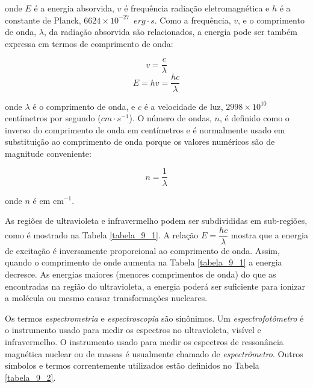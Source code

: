 \noindent onde $E$ é a energia absorvida, $v$ é frequência radiação eletromagnética e $h$ é a constante de Planck, $6624 \times 10^{-27}\enspace erg \cdot s$. Como a frequência, $v$, e o comprimento de onda, $\lambda$, da radiação absorvida são relacionados, a energia pode ser também expressa em termos de comprimento de onda:

\begin{equation}
    v = \dfrac{c}{\lambda}
\end{equation}
\begin{equation}
    E = hv = \dfrac{hc}{\lambda}
\end{equation}

\noindent onde $\lambda$ é o comprimento de onda, e $c$ é a velocidade de luz, $2998 \times 10^{10}$ centímetros por segundo ($cm \cdot s^{-1}$). O número de ondas, $n$, é definido como o inverso do comprimento de onda em centímetros e é normalmente usado em substituição ao comprimento de onda porque os valores numéricos são de magnitude conveniente:

\begin{equation}
    n = \dfrac{1}{\lambda}
\end{equation}

\noindent onde $n$ é em cm$^{-1}$. 

As regiões de ultravioleta e infravermelho podem ser subdivididas em sub-regiões, como é mostrado na Tabela \ref{tabela_9_1}. A relação $E = \dfrac{hc}{\lambda}$ mostra que a energia de excitação é inversamente proporcional ao comprimento de onda. Assim, quando o comprimento de onde aumenta na Tabela \ref{tabela_9_1} a energia decresce. As energias maiores (menores comprimentos de onda) do que as encontradas na região do ultravioleta, a energia poderá ser suficiente para ionizar a molécula ou mesmo causar transformações nucleares.

Os termos \textit{espectrometria} e \textit{espectroscopia} são sinônimos. Um \textit{espectrofotômetro} é o instrumento usado para medir os espectros no ultravioleta, visível e infravermelho. O instrumento usado para medir os espectros de ressonância magnética nuclear ou de massas é usualmente chamado de \textit{espectrômetro}. Outros símbolos e termos correntemente utilizados estão definidos no Tabela \ref{tabela_9_2}.

